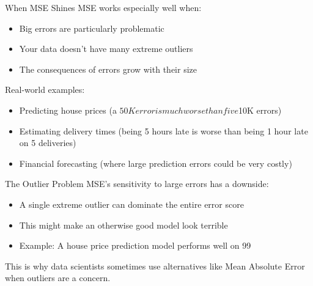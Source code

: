 \documentclass{beamer}
\begin{document}
\begin{frame}{When MSE Shines}
  MSE works especially well when:
  
  \begin{itemize}
    \item Big errors are particularly problematic
    \item Your data doesn't have many extreme outliers
    \item The consequences of errors grow with their size
  \end{itemize}
  
  \vspace{0.5cm}
  
  Real-world examples:
  \begin{itemize}
    \item Predicting house prices (a $50K error is much worse than five $10K errors)
    \item Estimating delivery times (being 5 hours late is worse than being 1 hour late on 5 deliveries)
    \item Financial forecasting (where large prediction errors could be very costly)
  \end{itemize}
\end{frame}

\begin{frame}{The Outlier Problem}
  MSE's sensitivity to large errors has a downside:
  
  \begin{itemize}
    \item A single extreme outlier can dominate the entire error score
    \item This might make an otherwise good model look terrible
    \item Example: A house price prediction model performs well on 99%
  \end{itemize}
  
  \vspace{0.5cm}
  
  This is why data scientists sometimes use alternatives like Mean Absolute Error when outliers are a concern.
\end{frame}
\end{document}
